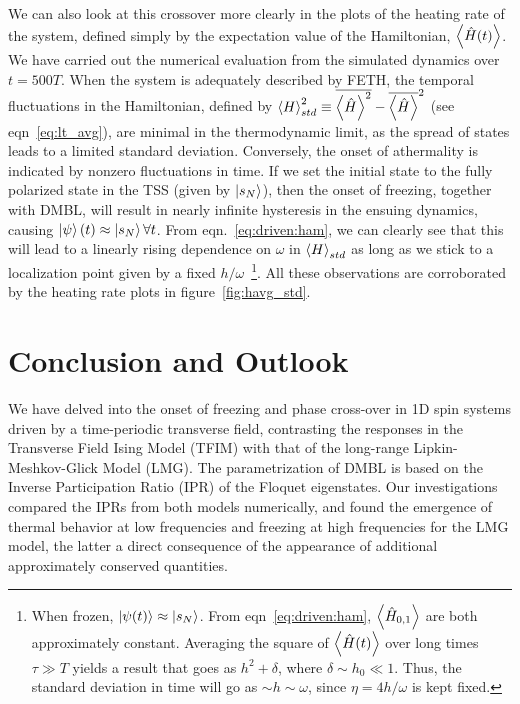 \documentclass[%
reprint,
superscriptaddress,
linenumbers,
amsmath,amssymb,
aps,
prb,
showkeys,
]{revtex4-2}
\begin{document}
	We can also look at this crossover more clearly in the plots of the heating rate of the system, defined simply by the expectation value of the Hamiltonian, $\expval{\hat{H}(t)}$. We have carried out the numerical evaluation from the simulated dynamics over $t=500 T$. When the system is adequately described by FETH, the temporal fluctuations in the {Hamiltonian}, defined by $\expval{H}^2_{std}\equiv \overline{\expval{\hat{H}}^2}-\overline{\expval{\hat{H}}}^2$ (see eqn~\ref{eq:lt_avg}), are minimal in the thermodynamic limit, as the spread of states leads to a limited standard deviation\cite{reimann_symmetry-prohibited_2021}. Conversely, the onset of athermality is indicated by nonzero fluctuations in time. If we set the initial state to the fully polarized state in the TSS (given by $\ket{s_N}$), then the 
	onset of freezing, together with DMBL, will result in nearly infinite hysteresis in the ensuing dynamics, causing $\ket{\psi}(t)\approx \ket{s_N} \forall t$. From eqn.~\ref{eq:driven:ham}, we can clearly see that this will lead to a linearly rising dependence on $\omega$ in $\expval{H}_{std}$ as long as we stick to a {localization point given by a fixed} $h/\omega$~\footnote{When frozen, $\ket{\psi(t)}\approx \ket{s_N}$. From eqn~\ref{eq:driven:ham}, $\expval{\hat{H}_{0,1}}$ are both approximately constant. Averaging the square of $\expval{\hat{H}(t)}$ over long times $\tau\gg T$ yields a result that goes as $h^2 + \delta$, where $\delta\sim h_0\ll 1$. Thus, the standard deviation in time will go as $\sim h\sim \omega$, since $\eta=4h/\omega$ is kept fixed.}. All these observations are corroborated by the heating rate plots in figure~\ref{fig:havg_std}.	
	\section{\label{sec:level7}Conclusion and Outlook}
	We have delved into the onset of freezing and phase cross-over in 1D spin systems driven by a time-periodic transverse field, contrasting the responses in the Transverse Field Ising Model (TFIM) with that of the long-range Lipkin-Meshkov-Glick Model (LMG). The parametrization of DMBL is based on the Inverse Participation Ratio (IPR) of the Floquet eigenstates. Our investigations compared the IPRs from both models numerically, and found the emergence of thermal behavior at low frequencies and freezing at high frequencies for the LMG model, the latter a direct consequence of the appearance of additional approximately conserved quantities.
\end{document}

